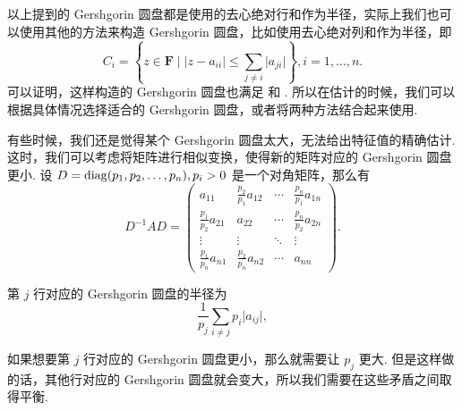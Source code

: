 以上提到的 Gershgorin 圆盘都是使用的去心绝对行和作为半径，实际上我们也可以使用其他的方法来构造 Gershgorin 圆盘，比如使用去心绝对列和作为半径，即 \[
    C_i = \left\{z \in \mathbf{F} \mid \lvert z - a_{ii} \rvert \leqslant \sum_{j \neq i} \lvert a_{ji} \rvert\right\}, i = 1, \ldots, n.
\]
可以证明，这样构造的 Gershgorin 圆盘也满足 和 . 所以在估计的时候，我们可以根据具体情况选择适合的 Gershgorin 圆盘，或者将两种方法结合起来使用.

有些时候，我们还是觉得某个 Gershgorin 圆盘太大，无法给出特征值的精确估计. 这时，我们可以考虑将矩阵进行相似变换，使得新的矩阵对应的 Gershgorin 圆盘更小. 设 $D = \operatorname{diag}(p_1, p_2, \ldots, p_n), p_i > 0$ 是一个对角矩阵，那么有 \[
    D^{-1} A D = \begin{pmatrix}
        a_{11}                 & \frac{p_2}{p_1} a_{12} & \cdots & \frac{p_n}{p_1} a_{1n} \\
        \frac{p_1}{p_2} a_{21} & a_{22}                 & \cdots & \frac{p_n}{p_2} a_{2n} \\
        \vdots                 & \vdots                 & \ddots & \vdots                 \\
        \frac{p_1}{p_n} a_{n1} & \frac{p_2}{p_n} a_{n2} & \cdots & a_{nn}
    \end{pmatrix}.
\]

第 $j$ 行对应的 Gershgorin 圆盘的半径为 \[
    \frac{1}{p_j} \sum_{i \neq j} p_i \lvert a_{ij} \rvert,
\]

如果想要第 $j$ 行对应的 Gershgorin 圆盘更小，那么就需要让 $p_j$ 更大. 但是这样做的话，其他行对应的 Gershgorin 圆盘就会变大，所以我们需要在这些矛盾之间取得平衡.

